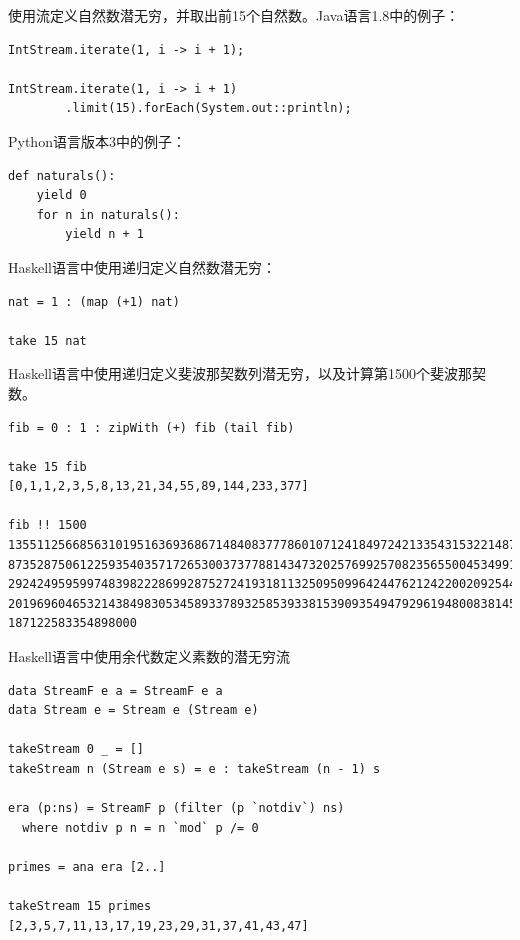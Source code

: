 \documentclass{article}
\begin{document}
使用流定义自然数潜无穷，并取出前15个自然数。Java语言1.8中的例子：

\lstset{frame=single, language=Java}
\begin{lstlisting}
IntStream.iterate(1, i -> i + 1);

IntStream.iterate(1, i -> i + 1)
        .limit(15).forEach(System.out::println);
\end{lstlisting}

Python语言版本3中的例子：

\lstset{frame=single, language=Python}
\begin{lstlisting}
def naturals():
    yield 0
    for n in naturals():
        yield n + 1
\end{lstlisting}

Haskell语言中使用递归定义自然数潜无穷：

\lstset{frame=single, language=Haskell}
\begin{lstlisting}
nat = 1 : (map (+1) nat)

take 15 nat
\end{lstlisting}

Haskell语言中使用递归定义斐波那契数列潜无穷，以及计算第1500个斐波那契数。

\lstset{frame=single, language=Haskell}
\begin{lstlisting}
fib = 0 : 1 : zipWith (+) fib (tail fib)

take 15 fib
[0,1,1,2,3,5,8,13,21,34,55,89,144,233,377]

fib !! 1500
13551125668563101951636936867148408377786010712418497242133543153221487310
87352875061225935403571726530037377881434732025769925708235655004534991410
29242495959974839822286992875272419318113250950996424476212422002092544399
20196960465321438498305345893378932585393381539093549479296194800838145996
187122583354898000
\end{lstlisting}

Haskell语言中使用余代数定义素数的潜无穷流

\lstset{frame=single, language=Haskell}
\begin{lstlisting}
data StreamF e a = StreamF e a
data Stream e = Stream e (Stream e)

takeStream 0 _ = []
takeStream n (Stream e s) = e : takeStream (n - 1) s

era (p:ns) = StreamF p (filter (p `notdiv`) ns)
  where notdiv p n = n `mod` p /= 0

primes = ana era [2..]

takeStream 15 primes
[2,3,5,7,11,13,17,19,23,29,31,37,41,43,47]
\end{lstlisting}
\end{document}
